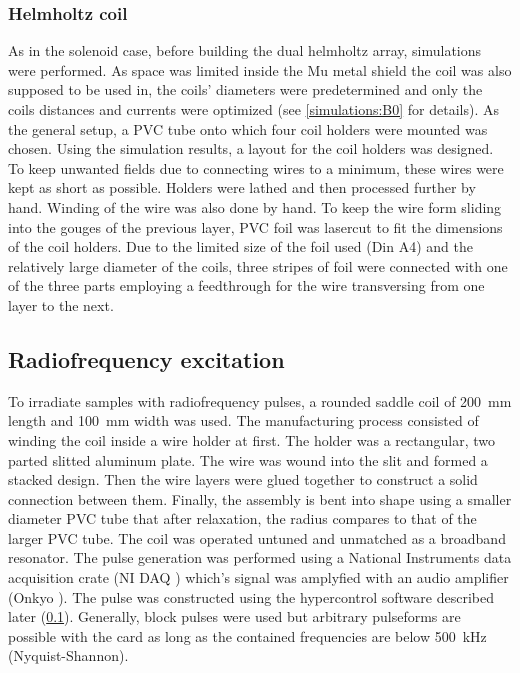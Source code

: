         \subsubsection{Helmholtz coil}
            As in the solenoid case, before building the dual helmholtz array, simulations were performed.  As space was limited inside the Mu metal shield the coil was also supposed to be used in, the coils' diameters were predetermined and only the coils distances and currents were optimized (see \ref{simulations:B0} for details). As the general setup, a PVC tube onto which four coil holders were mounted was chosen. Using the simulation results, a layout for the coil holders was designed. To keep unwanted fields due to connecting wires to a minimum, these wires were kept as short as possible. Holders were lathed and then processed further by hand. Winding of the wire was also done by hand. To keep the wire form sliding into the gouges of the previous layer, PVC foil was lasercut to fit the dimensions of the coil holders. Due to the limited size of the foil used (Din A4) and the relatively large diameter of the coils, three stripes of foil were connected with one of the three parts employing a feedthrough for the wire transversing from one layer to the next. 
        \subsection{Radiofrequency excitation}
            To irradiate samples with radiofrequency pulses, a rounded saddle coil of \SI{200}{\mm} length and \SI{100}{\mm} width was used. The manufacturing process consisted of winding the coil inside a wire holder at first. The holder was a rectangular, two parted slitted aluminum plate. The wire was wound into the slit and formed a stacked design. Then the wire layers were glued together to construct a solid connection between them.  Finally, the assembly is bent into shape using a smaller diameter PVC tube that after relaxation, the radius compares to that of the larger PVC tube. The coil was operated untuned and unmatched as a broadband resonator. The pulse generation was performed using a National Instruments data acquisition crate (NI DAQ ) which's signal was amplyfied with an audio amplifier (Onkyo ).
            The pulse was constructed using the hypercontrol software described later (\ref{}). Generally, block pulses were used but arbitrary pulseforms are possible with the card as long as the contained frequencies are below \SI{500}{\kilo\hertz} (Nyquist-Shannon). 
